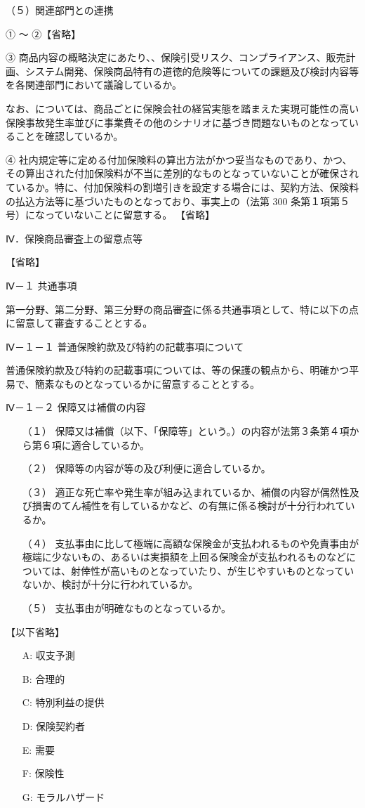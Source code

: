 \documentclass[report,gutter=10mm,fore-edge=10mm,uplatex,dvipdfmx]{jlreq}
\begin{document}
（５）関連部門との連携

① ～ ②【省略】

③ 商品内容の概略決定にあたり、、保険引受リスク、コンプライアンス、販売計画、システム開発、保険商品特有の道徳的危険等についての課題及び検討内容等を各関連部門において議論しているか。

なお、については、商品ごとに保険会社の経営実態を踏まえた実現可能性の高い保険事故発生率並びに事業費その他のシナリオに基づき問題ないものとなっていることを確認しているか。

④ 社内規定等に定める付加保険料の算出方法がかつ妥当なものであり、かつ、その算出された付加保険料が不当に差別的なものとなっていないことが確保されているか。特に、付加保険料の割増引きを設定する場合には、契約方法、保険料の払込方法等に基づいたものとなっており、事実上の（法第 300 条第１項第５号）になっていないことに留意する。
【省略】

Ⅳ．保険商品審査上の留意点等

【省略】

Ⅳ－１ 共通事項

第一分野、第二分野、第三分野の商品審査に係る共通事項として、特に以下の点に留意して審査することとする。

Ⅳ－１－１ 普通保険約款及び特約の記載事項について

普通保険約款及び特約の記載事項については、等の保護の観点から、明確かつ平易で、簡素なものとなっているかに留意することとする。

Ⅳ－１－２ 保障又は補償の内容

\begin{itemize}
\item[ （１） ] 保障又は補償（以下、「保障等」という。）の内容が法第３条第４項から第６項に適合しているか。
\item[ （２） ] 保障等の内容が等の及び利便に適合しているか。
\item[ （３） ] 適正な死亡率や発生率が組み込まれているか、補償の内容が偶然性及び損害のてん補性を有しているかなど、の有無に係る検討が十分行われているか。
\item[ （４） ] 支払事由に比して極端に高額な保険金が支払われるものや免責事由が極端に少ないもの、あるいは実損額を上回る保険金が支払われるものなどについては、射倖性が高いものとなっていたり、が生じやすいものとなっていないか、検討が十分に行われているか。
\item[ （５） ] 支払事由が明確なものとなっているか。
\end{itemize}
【以下省略】
\answer{}
\begin{itemize}
\item[ A: ] 収支予測
\item[ B: ] 合理的
\item[ C: ] 特別利益の提供
\item[ D: ] 保険契約者
\item[ E: ] 需要
\item[ F: ] 保険性
\item[ G: ] モラルハザード
\end{itemize}
\end{document}
